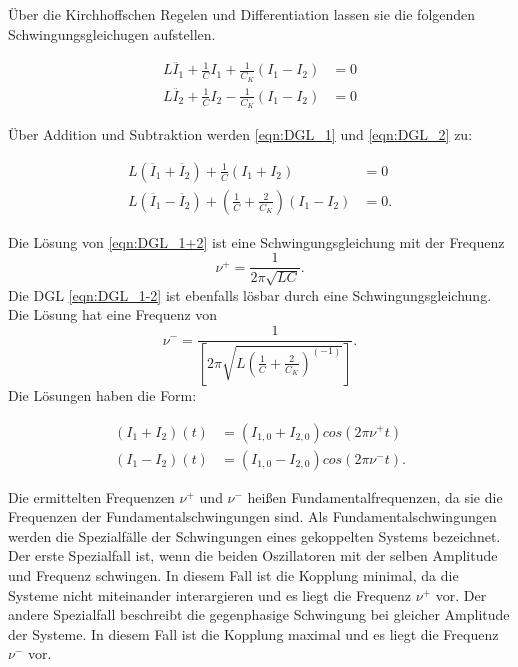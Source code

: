 Über die Kirchhoffschen Regelen und Differentiation lassen sie die folgenden
Schwingungsgleichugen aufstellen.

\begin{align}
  \label{eqn:DGL_1}
  L\ddot{I_1} + \frac{1}{C}I_1+\frac{1}{C_K}\left(I_1 - I_2 \right) &= 0\\
  \label{eqn:DGL_2}
  L\ddot{I_2} + \frac{1}{C}I_2-\frac{1}{C_K}\left(I_1 - I_2 \right) &= 0
\end{align}

Über Addition und Subtraktion werden \eqref{eqn:DGL_1} und \eqref{eqn:DGL_2}
zu:

\begin{align}
  \label{eqn:DGL_1+2}
  L\left(\ddot{I_1} + \ddot{I_2}\right) + \frac{1}{C}\left(I_1 + I_2\right)&=0\\
  \label{eqn:DGL_1-2}
  L\left(\ddot{I_1} - \ddot{I_2}\right) + \left(\frac{1}{C} + \frac{2}{C_K}\right)\left(I_1 - I_2\right)&=0.
\end{align}

Die Lösung von \eqref{eqn:DGL_1+2} ist eine Schwingungsgleichung mit der Frequenz
\begin{equation}
  \nu^+ = \frac{1}{2\pi\sqrt{LC}}.
\end{equation}
Die DGL \eqref{eqn:DGL_1-2} ist ebenfalls
lösbar durch eine Schwingungsgleichung. Die Lösung hat eine Frequenz von
\begin{equation}
  \nu^- = \frac{1}{\left[2\pi\sqrt{L\left(\frac{1}{C}+\frac{2}{C_K}\right)^{(-1)}}\right]}.
\end{equation}
Die Lösungen haben die Form:

\begin{align}
  \left(I_1 + I_2\right)(t) &= \left(I_{1,0} + I_{2,0}\right)cos\left(2\pi\nu^+t\right)\\
  \left(I_1 - I_2\right)(t) &= \left(I_{1,0} - I_{2,0}\right)cos\left(2\pi\nu^-t\right).
\end{align}

Die ermittelten Frequenzen $\nu^+$ und $\nu^-$ heißen Fundamentalfrequenzen,
da sie die Frequenzen der Fundamentalschwingungen sind. Als Fundamentalschwingungen
werden die Spezialfälle der Schwingungen eines gekoppelten Systems bezeichnet.
Der erste Spezialfall ist, wenn die beiden Oszillatoren mit der selben
Amplitude und Frequenz schwingen.
In diesem Fall ist die Kopplung minimal, da die Systeme nicht miteinander interargieren
und es liegt die Frequenz $\nu^+$ vor. Der andere Spezialfall beschreibt die
gegenphasige Schwingung bei gleicher Amplitude der Systeme. In diesem Fall
ist die Kopplung maximal und es liegt die Frequenz $\nu^-$ vor.

